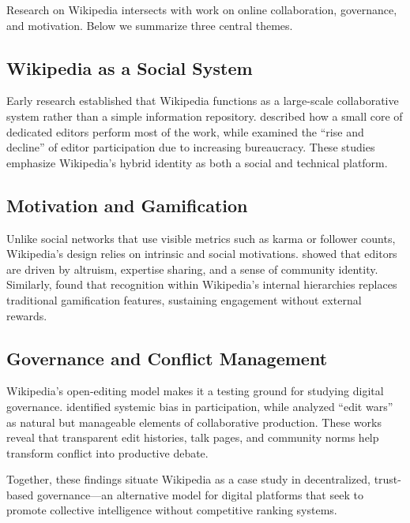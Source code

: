 
\label{sec:relatedwork}

Research on Wikipedia intersects with work on online collaboration, governance, and motivation. Below we summarize three central themes.

\subsection{Wikipedia as a Social System}
Early research established that Wikipedia functions as a large-scale collaborative system rather than a simple information repository. \citet{panciera2009wikipedians} described how a small core of dedicated editors perform most of the work, while \citet{halfaker2013riseanddecline} examined the “rise and decline” of editor participation due to increasing bureaucracy. These studies emphasize Wikipedia’s hybrid identity as both a social and technical platform.

\subsection{Motivation and Gamification}
Unlike social networks that use visible metrics such as karma or follower counts, Wikipedia’s design relies on intrinsic and social motivations. \citet{forte2013motivation} showed that editors are driven by altruism, expertise sharing, and a sense of community identity. Similarly, \citet{arazy2016quality} found that recognition within Wikipedia’s internal hierarchies replaces traditional gamification features, sustaining engagement without external rewards.

\subsection{Governance and Conflict Management}
Wikipedia’s open-editing model makes it a testing ground for studying digital governance. \citet{lam2011wpbias} identified systemic bias in participation, while \citet{viegas2007editwars} analyzed “edit wars” as natural but manageable elements of collaborative production. These works reveal that transparent edit histories, talk pages, and community norms help transform conflict into productive debate.

Together, these findings situate Wikipedia as a case study in decentralized, trust-based governance—an alternative model for digital platforms that seek to promote collective intelligence without competitive ranking systems.
